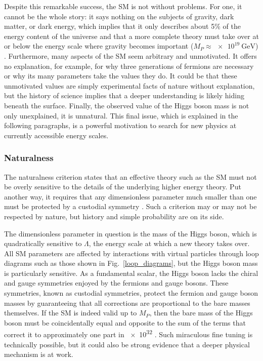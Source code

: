 

Despite this remarkable success, the SM is not without problems. For one, it cannot be the whole story: it says nothing on the subjects of gravity, dark matter, or dark energy, which implies that it only describes about 5\% of the energy content of the universe \cite{fukugita_2004} and that a more complete theory must take over at or below the energy scale where gravity becomes important ($M_{P}\approx\SI{e19}{\GeV}$) \cite{giudice_naturalness_2008}. Furthermore, many aspects of the SM seem arbitrary and unmotivated. It offers no explanation, for example, for why three generations of fermions are necessary or why its many parameters take the values they do. It could be that these unmotivated values are simply experimental facts of nature without explanation, but the history of science implies that a deeper understanding is likely hiding beneath the surface. Finally, the observed value of the Higgs boson mass is not only unexplained, it is unnatural. This final issue, which is explained in the following paragraphs, is a powerful motivation to search for new physics at currently accessible energy scales.

\subsubsection{Naturalness}
The naturalness criterion states that an effective theory such as the SM must not be overly sensitive to the details of the underlying higher energy theory. Put another way, it requires that any dimensionless parameter much smaller than one must be protected by a custodial symmetry \cite{thooft_naturalness}. Such a criterion may or may not be respected by nature, but history and simple probability are on its side.

The dimensionless parameter in question is the mass of the Higgs boson, which is quadratically sensitive to $\Lambda$, the energy scale at which a new theory takes over. All SM parameters are affected by interactions with virtual particles through loop diagrams such as those shown in Fig.~\ref{loop_diagrams}, but the Higgs boson mass is particularly sensitive. As a fundamental scalar, the Higgs boson lacks the chiral and gauge symmetries enjoyed by the fermions and gauge bosons. These symmetries, known as custodial symmetries, protect the fermion and gauge boson masses by guaranteeing that all corrections are proportional to the bare masses themselves. If the SM is indeed valid up to $M_{P}$, then the bare mass of the Higgs boson must be coincidentally equal and opposite to the sum of the terms that correct it to approximately one part in \num{e32} \cite{giudice_naturalness_2008}. Such miraculous fine tuning is technically possible, but it could also be strong evidence that a deeper physical mechanism is at work.




\pagebreak